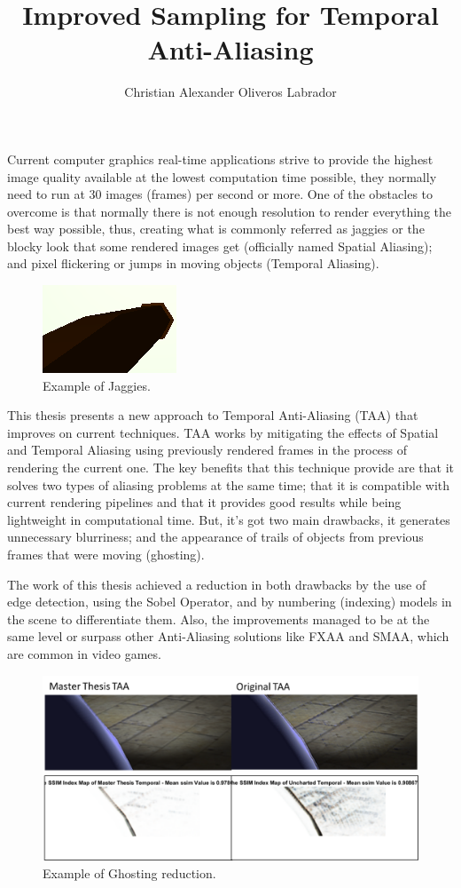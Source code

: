 \documentclass{popsci}
\author{Christian Alexander Oliveros Labrador}
\title{Improved Sampling for Temporal Anti-Aliasing}
\begin{document}


{\noindent Current computer graphics real-time applications strive to provide the highest image quality available at the lowest computation time possible, they normally need to run at 30 images (frames) per second or more. One of the obstacles to overcome is that normally there is not enough resolution to render everything the best way possible, thus, creating what is commonly referred as jaggies or the blocky look that some rendered images get (officially named Spatial Aliasing); and pixel flickering or jumps in moving objects (Temporal Aliasing).  
	
\begin{figure}[!hbt]
	\centering
	\includegraphics[scale=0.87]{images/pipe_sobel_no_aa.png}
	\caption{Example of Jaggies.}\label{fig:jaggies}
\end{figure}
	
This thesis presents a new approach to Temporal Anti-Aliasing (TAA) that improves on current techniques. TAA works by mitigating the effects of Spatial and Temporal Aliasing using previously rendered frames in the process of rendering the current one. The key benefits that this technique provide are that it solves two types of aliasing problems at the same time; that it is compatible with current rendering pipelines and that it provides good results while being lightweight in computational time. But, it’s got two main drawbacks, it generates unnecessary blurriness; and the appearance of trails of objects from previous frames that were moving (ghosting). 

The work of this thesis achieved a reduction in both drawbacks by the use of edge detection, using the Sobel Operator, and by numbering (indexing) models in the scene to differentiate them. Also, the improvements managed to be at the same level or surpass other Anti-Aliasing solutions like FXAA and SMAA, which are common in video games.


\begin{figure}[!hbt]
	\centering
	\includegraphics[scale=0.6]{images/ghosting.png}
	\caption{Example of Ghosting reduction.}\label{fig:ghosting}
\end{figure}
	
}
\end{document}
